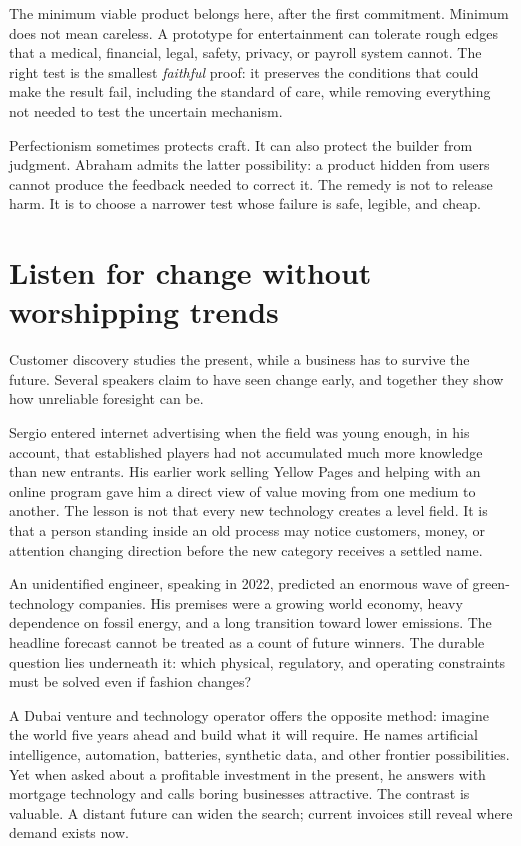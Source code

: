 The minimum viable product belongs here, after the first commitment. Minimum
does not mean careless. A prototype for entertainment can tolerate rough edges
that a medical, financial, legal, safety, privacy, or payroll system cannot.
The right test is the smallest \emph{faithful} proof: it preserves the conditions
that could make the result fail, including the standard of care, while removing
everything not needed to test the uncertain mechanism.

Perfectionism sometimes protects craft. It can also protect the builder from
judgment. Abraham admits the latter possibility: a product hidden from users
cannot produce the feedback needed to correct it. The remedy is not to release
harm. It is to choose a narrower test whose failure is safe, legible, and cheap.

\section{Listen for change without worshipping trends}

Customer discovery studies the present, while a business has to survive the
future. Several speakers claim to have seen change early, and together they
show how unreliable foresight can be.

Sergio entered internet advertising when the field was young enough, in his
account, that established players had not accumulated much more knowledge than
new entrants. His earlier work selling Yellow Pages and helping with an online
program gave him a direct view of value moving from one medium to another. The
lesson is not that every new technology creates a level field. It is that a
person standing inside an old process may notice customers, money, or attention
changing direction before the new category receives a settled name.

An unidentified engineer, speaking in 2022, predicted an enormous wave of
green-technology companies. His premises were a growing world economy, heavy
dependence on fossil energy, and a long transition toward lower emissions. The
headline forecast cannot be treated as a count of future winners. The durable
question lies underneath it: which physical, regulatory, and operating
constraints must be solved even if fashion changes?

A Dubai venture and technology operator offers the opposite method: imagine
the world five years ahead and build what it will require. He names artificial
intelligence, automation, batteries, synthetic data, and other frontier
possibilities. Yet when asked about a profitable investment in the present, he
answers with mortgage technology and calls boring businesses attractive. The
contrast is valuable. A distant future can widen the search; current invoices
still reveal where demand exists now.

